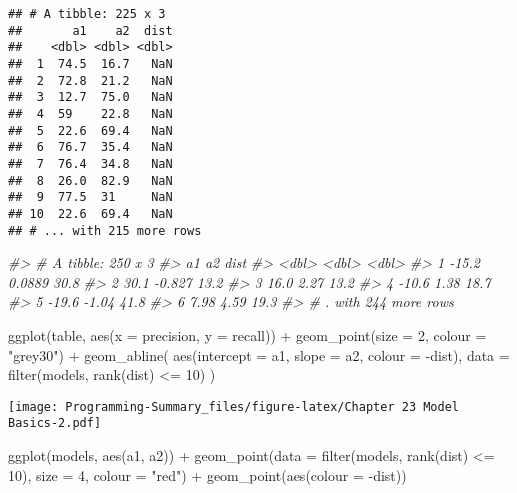 \documentclass[
]{article}
\newenvironment{Shaded}{\begin{snugshade}}{\end{snugshade}}
\newcommand{\AttributeTok}[1]{\textcolor[rgb]{0.77,0.63,0.00}{#1}}
\newcommand{\CommentTok}[1]{\textcolor[rgb]{0.56,0.35,0.01}{\textit{#1}}}
\newcommand{\DecValTok}[1]{\textcolor[rgb]{0.00,0.00,0.81}{#1}}
\newcommand{\FunctionTok}[1]{\textcolor[rgb]{0.00,0.00,0.00}{#1}}
\newcommand{\NormalTok}[1]{#1}
\newcommand{\SpecialCharTok}[1]{\textcolor[rgb]{0.00,0.00,0.00}{#1}}
\newcommand{\StringTok}[1]{\textcolor[rgb]{0.31,0.60,0.02}{#1}}
\begin{document}
\begin{verbatim}
## # A tibble: 225 x 3
##       a1    a2  dist
##    <dbl> <dbl> <dbl>
##  1  74.5  16.7   NaN
##  2  72.8  21.2   NaN
##  3  12.7  75.0   NaN
##  4  59    22.8   NaN
##  5  22.6  69.4   NaN
##  6  76.7  35.4   NaN
##  7  76.4  34.8   NaN
##  8  26.0  82.9   NaN
##  9  77.5  31     NaN
## 10  22.6  69.4   NaN
## # ... with 215 more rows
\end{verbatim}

\begin{Shaded}
\begin{Highlighting}[]
\CommentTok{\#\textgreater{} \# A tibble: 250 x 3}
\CommentTok{\#\textgreater{}       a1      a2  dist}
\CommentTok{\#\textgreater{}    \textless{}dbl\textgreater{}   \textless{}dbl\textgreater{} \textless{}dbl\textgreater{}}
\CommentTok{\#\textgreater{} 1 {-}15.2   0.0889  30.8}
\CommentTok{\#\textgreater{} 2  30.1  {-}0.827   13.2}
\CommentTok{\#\textgreater{} 3  16.0   2.27    13.2}
\CommentTok{\#\textgreater{} 4 {-}10.6   1.38    18.7}
\CommentTok{\#\textgreater{} 5 {-}19.6  {-}1.04    41.8}
\CommentTok{\#\textgreater{} 6   7.98  4.59    19.3}
\CommentTok{\#\textgreater{} \# . with 244 more rows}

\FunctionTok{ggplot}\NormalTok{(table, }\FunctionTok{aes}\NormalTok{(}\AttributeTok{x =}\NormalTok{ precision, }\AttributeTok{y =}\NormalTok{ recall)) }\SpecialCharTok{+} 
  \FunctionTok{geom\_point}\NormalTok{(}\AttributeTok{size =} \DecValTok{2}\NormalTok{, }\AttributeTok{colour =} \StringTok{"grey30"}\NormalTok{) }\SpecialCharTok{+} 
  \FunctionTok{geom\_abline}\NormalTok{(}
    \FunctionTok{aes}\NormalTok{(}\AttributeTok{intercept =}\NormalTok{ a1, }\AttributeTok{slope =}\NormalTok{ a2, }\AttributeTok{colour =} \SpecialCharTok{{-}}\NormalTok{dist), }
    \AttributeTok{data =} \FunctionTok{filter}\NormalTok{(models, }\FunctionTok{rank}\NormalTok{(dist) }\SpecialCharTok{\textless{}=} \DecValTok{10}\NormalTok{)}
\NormalTok{  )}
\end{Highlighting}
\end{Shaded}

\texttt{[image: Programming-Summary\_files/figure-latex/Chapter 23 Model Basics-2.pdf]}

\begin{Shaded}
\begin{Highlighting}[]
\FunctionTok{ggplot}\NormalTok{(models, }\FunctionTok{aes}\NormalTok{(a1, a2)) }\SpecialCharTok{+}
  \FunctionTok{geom\_point}\NormalTok{(}\AttributeTok{data =} \FunctionTok{filter}\NormalTok{(models, }\FunctionTok{rank}\NormalTok{(dist) }\SpecialCharTok{\textless{}=} \DecValTok{10}\NormalTok{), }\AttributeTok{size =} \DecValTok{4}\NormalTok{, }\AttributeTok{colour =} \StringTok{"red"}\NormalTok{) }\SpecialCharTok{+}
  \FunctionTok{geom\_point}\NormalTok{(}\FunctionTok{aes}\NormalTok{(}\AttributeTok{colour =} \SpecialCharTok{{-}}\NormalTok{dist))}
\end{Highlighting}
\end{Shaded}
\end{document}
